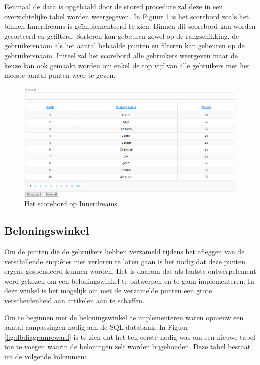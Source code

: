 Eenmaal de data is opgehaald door de stored procedure zal deze in een overzichtelijke tabel worden weergegeven. In Figuur \ref{fig:leaderboardinnerdreams} is het scorebord zoals het binnen Innerdreams is geïmplementeerd te zien. Binnen dit scorebord kan worden gesorteerd en gefilterd. Sorteren kan gebeuren zowel op de rangschikking, de gebruikersnaam als het aantal behaalde punten en filteren kan gebeuren op de gebruikersnaam. Initeel zal het scorebord alle gebruikers weergeven maar de keuze kan ook gemaakt worden om enkel de top vijf van alle gebruikers met het meeste aantal punten weer te geven.

\begin{figure}
    \includegraphics[width=\linewidth]{LeaderboardInnerdreams.png}
    \caption{Het scorebord op Innerdreams.}
    \label{fig:leaderboardinnerdreams}
\end{figure}

\subsection{Beloningswinkel}

Om de punten die de gebruikers hebben verzameld tijdens het afleggen van de verschillende enquêtes niet verloren te laten gaan is het nodig dat deze punten ergens gespendeerd kunnen worden. Het is daarom dat als laatste ontwerpelement werd gekozen om een beloningswinkel te ontwerpen en te gaan implementeren. In deze winkel is het mogelijk om met de verzamelde punten een grote verscheidenheid aan artikelen aan te schaffen.

Om te beginnen met de beloningswinkel te implementeren waren opnieuw een aantal aanpassingen nodig aan de SQL databank. In Figuur \ref{fig:dbdiagramreward} is te zien dat het ten eerste nodig was om een nieuwe tabel toe te voegen waarin de beloningen zelf worden bijgehouden. Deze tabel bestaat uit de volgende kolommen:


